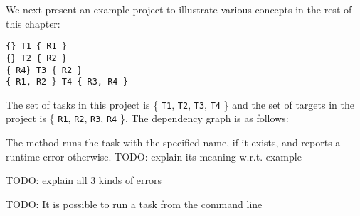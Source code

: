 We next present an example project to illustrate various concepts in the rest of
this chapter:

\begin{framed}
\begin{verbatim}
{} T1 { R1 }
{} T2 { R2 }
{ R4} T3 { R2 }
{ R1, R2 } T4 { R3, R4 }
\end{verbatim}
\end{framed} 

The set of tasks in this project is \{ {\tt T1}, {\tt T2}, {\tt T3}, {\tt T4} \}
and the set of targets in the project is \{ {\tt R1}, {\tt R2}, {\tt R3}, {\tt R4} \}.
The dependency graph is as follows:

\begin{center}
\end{center}

The  method runs the task with the specified name, if it exists,
and reports a runtime error otherwise.
TODO: explain its meaning w.r.t. example

TODO: explain all 3 kinds of errors

TODO: It is possible to run a task from the command line

